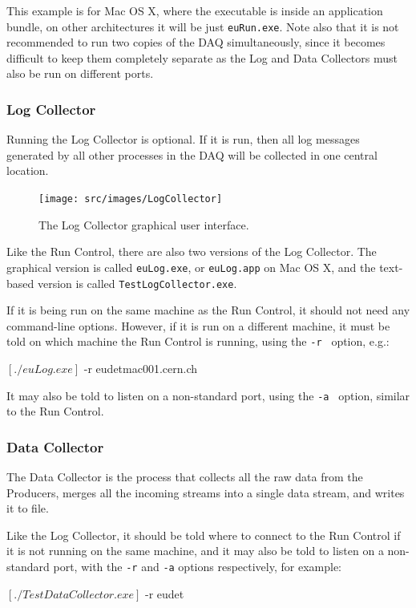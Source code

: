 This example is for Mac OS X, where the executable is inside an application bundle,
on other architectures it will be just \texttt{euRun.exe}.
Note also that it is not recommended to run two copies of the DAQ simultaneously,
since it becomes difficult to keep them completely separate as the Log and Data Collectors
must also be run on different ports.

\subsubsection{Log Collector}
Running the Log Collector is optional. If it is run, then all log messages generated by all other processes
in the DAQ will be collected in one central location.

\begin{figure}[htb]
  \begin{center}
    \texttt{[image: src/images/LogCollector]}
    \caption{The Log Collector graphical user interface.}
    \label{fig:LogCollector}
  \end{center}
\end{figure}

Like the Run Control, there are also two versions of the Log Collector.
The graphical version is called \texttt{euLog.exe}, or \texttt{euLog.app} on Mac OS X,
and the text-based version is called \texttt{TestLogCollector.exe}.

If it is being run on the same machine as the Run Control, it should not need any command-line options.
However, if it is run on a different machine, it must be told on which machine the Run Control is running,
using the \texttt{-r } option, e.g.:
\begin{listing}[mybash]
$[./euLog.exe]$ -r eudetmac001.cern.ch
\end{listing}

It may also be told to listen on a non-standard port, using the \texttt{-a } option, similar to the Run Control.

\subsubsection{Data Collector}
The Data Collector is the process that collects all the raw data from the Producers,
merges all the incoming streams into a single data stream, and writes it to file.

Like the Log Collector, it should be told where to connect to the Run Control if it is not running on the same machine,
and it may also be told to listen on a non-standard port, with the \texttt{-r} and \texttt{-a} options respectively, for example:
\begin{listing}[mybash]
$[./TestDataCollector.exe]$ -r eudet
\end{listing}

